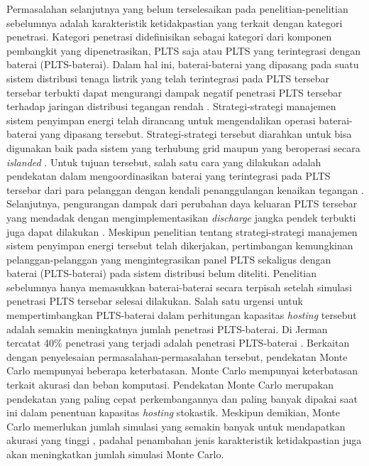 Permasalahan selanjutnya yang belum terselesaikan pada penelitian-penelitian sebelumnya adalah karakteristik ketidakpastian yang terkait dengan kategori penetrasi. Kategori penetrasi didefinisikan sebagai kategori dari komponen pembangkit yang dipenetrasikan, PLTS saja atau PLTS yang terintegrasi dengan baterai (PLTS-baterai). Dalam hal ini, baterai-baterai yang dipasang pada suatu sistem distribusi tenaga listrik yang telah terintegrasi pada PLTS tersebar tersebar terbukti dapat mengurangi dampak negatif penetrasi PLTS tersebar terhadap jaringan distribusi tegangan rendah \cite{Mokhtari2013,Alam2013,Tran2019}. Strategi-strategi manajemen sistem penyimpan energi telah dirancang untuk mengendalikan operasi baterai-baterai yang dipasang tersebut. Strategi-strategi tersebut diarahkan untuk bisa digunakan baik pada sistem yang terhubung grid maupun yang beroperasi secara \textit{islanded} \cite{Tran2019}. Untuk tujuan tersebut, salah satu cara yang dilakukan adalah pendekatan dalam mengoordinasikan baterai yang terintegrasi pada PLTS tersebar dari para pelanggan dengan kendali penanggulangan kenaikan tegangan \cite{Mokhtari2013}. Selanjutnya, pengurangan dampak dari perubahan daya keluaran PLTS tersebar yang mendadak dengan mengimplementasikan \textit{discharge} jangka pendek terbukti juga dapat dilakukan \cite{Alam2013}. Meskipun penelitian tentang strategi-strategi manajemen sistem penyimpan energi tersebut telah dikerjakan, pertimbangan kemungkinan pelanggan-pelanggan yang mengintegrasikan panel PLTS sekaligus dengan baterai (PLTS-baterai) pada sistem distribusi belum diteliti. Penelitian sebelumnya hanya memasukkan baterai-baterai secara terpisah setelah simulasi penetrasi PLTS tersebar selesai dilakukan. Salah satu urgensi untuk mempertimbangkan PLTS-baterai dalam perhitungan kapasitas \textit{hosting} tersebut adalah semakin meningkatnya jumlah penetrasi PLTS-baterai. Di Jerman tercatat 40\% penetrasi yang terjadi adalah penetrasi PLTS-baterai \cite{irena2019}. Berkaitan dengan penyelesaian permasalahan-permasalahan tersebut, pendekatan Monte Carlo mempunyai beberapa keterbatasan. Monte Carlo mempunyai keterbatasan terkait akurasi dan beban komputasi. Pendekatan Monte Carlo merupakan pendekatan yang paling cepat perkembangannya dan paling banyak dipakai saat ini dalam penentuan kapasitas \textit{hosting} stokastik. Meskipun demikian, Monte Carlo memerlukan jumlah simulasi yang semakin banyak untuk mendapatkan akurasi yang tinggi \cite{Dubey2017}, padahal penambahan jenis karakteristik ketidakpastian juga akan meningkatkan jumlah simulasi Monte Carlo.

